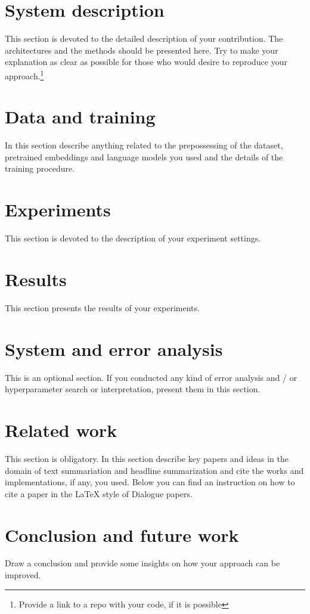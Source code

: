 \documentclass{dialogue}
\begin{document}
\section{System description}
This section is devoted to the detailed description of your contribution. The architectures and the methods should be presented here. Try to make your explanation as clear as possible for those who would desire to reproduce your approach.\footnote{Provide a link to a repo with your code, if it is possible}

\section{Data and training}
In this section describe anything related to the prepossessing of the dataset, pretrained embeddings and language models you used and the details of the training procedure.

\section{Experiments}
This section is devoted to the description of your experiment settings.

\section{Results}
This section presents the results of your experiments.

\section{System and error analysis}
This is an optional section. If you conducted any kind of error analysis and / or hyperparameter search or interpretation, present them in this section.

\section{Related work}
This section is obligatory. In this section describe key papers and ideas in the domain of text summariation and headline summarization and cite the works and implementations, if any, you used. Below you can find an instruction on how to cite a paper in the {\LaTeX} style of Dialogue papers.

\section{Conclusion and future work}
Draw a conclusion and provide some insights on how your approach can be improved.
\end{document}
